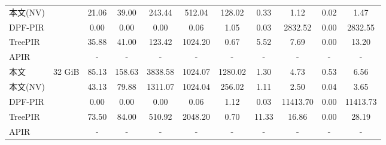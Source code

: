 \begin{table}[]
\begin{tabular}{@{}lc|ccc|cccccc@{}}
        本文(NV) &                           & 21.06                        & 39.00                      & 243.44  & 512.04                        & \multicolumn{1}{c|}{128.02}  & 0.33  & 1.12     & 0.02        & 1.47     \\
        DPF-PIR       &                           & 0.00                         & 0.00                       & 0.00    & 0.06                          & \multicolumn{1}{c|}{1.05}    & 0.03  & 2832.52  & 0.00        & 2832.55  \\
        TreePIR   &                           & 35.88                        & 41.00                      & 123.42  & 1024.20                       & \multicolumn{1}{c|}{0.67}    & 5.52  & 7.69     & 0.00        & 13.20    \\
        APIR      &                           & -                            & -                          & -       & -                             & \multicolumn{1}{c|}{-}       & -     & -        & -           & -        \\ \midrule
        本文     & \multirow{5}{*}{32 GiB}  & 85.13                        & 158.63                     & 3838.58 & 1024.07                       & \multicolumn{1}{c|}{1280.02} & 1.30  & 4.73     & 0.53        & 6.56     \\
        本文(NV) &                           & 43.13                        & 79.88                      & 1311.07 & 1024.04                       & \multicolumn{1}{c|}{256.02}  & 1.11  & 2.50     & 0.04        & 3.65     \\
        DPF-PIR       &                           & 0.00                         & 0.00                       & 0.00    & 0.06                          & \multicolumn{1}{c|}{1.12}    & 0.03  & 11413.70 & 0.00        & 11413.73 \\
        TreePIR   &                           & 73.50                        & 84.00                      & 510.92  & 2048.20                       & \multicolumn{1}{c|}{0.70}    & 11.33 & 16.86    & 0.00        & 28.19    \\
        APIR      &                           & -                            & -                          & -       & -                             & \multicolumn{1}{c|}{-}       & -     & -        & -           & -        \\ \bottomrule
    \end{tabular}
\end{table}

